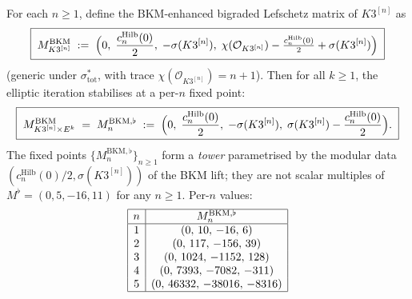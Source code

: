 \begin{theorem}
\label{thm:hyperkahler-bkm-lift-fixed-point-tower}
For each $n \geq 1$, define the BKM-enhanced bigraded Lefschetz matrix
of $K3^{[n]}$ as
\[
 \boxed{\;
 M^{\mathrm{BKM}}_{K3^{[n]}}
 \;:=\; \Bigl(0, \;\frac{c_n^{\mathrm{Hilb}}(0)}{2}, \;
 -\sigma(K3^{[n]}), \;
 \chi(\mathcal{O}_{K3^{[n]}})
 - \tfrac{c_n^{\mathrm{Hilb}}(0)}{2}
 + \sigma(K3^{[n]})\Bigr)
 \;}
\]
\textup{(}generic under $\sigma_{\mathrm{tot}}^*$, with trace
$\chi(\mathcal{O}_{K3^{[n]}}) = n + 1$\textup{).} Then for all
$k \geq 1$, the elliptic iteration stabilises at a per-$n$ fixed point:
\[
 \boxed{\;
 M_{K3^{[n]} \times E^k}^{\mathrm{BKM}}
 \;=\; M^{\mathrm{BKM}, \flat}_n
 \;:=\; \Bigl(0, \;\frac{c_n^{\mathrm{Hilb}}(0)}{2}, \;
 -\sigma(K3^{[n]}), \;
 \sigma(K3^{[n]}) - \frac{c_n^{\mathrm{Hilb}}(0)}{2}\Bigr).
 \;}
\]
The fixed points $\{M^{\mathrm{BKM}, \flat}_n\}_{n \geq 1}$ form a
\emph{tower} parametrised by the modular data
$(c_n^{\mathrm{Hilb}}(0) / 2, \sigma(K3^{[n]}))$ of the BKM lift; they
are not scalar multiples of $M^{\flat} = (0, 5, -16, 11)$ for any
$n \geq 1$. Per-$n$ values:
\[
\begin{array}{|c|c|}
\hline
n & M^{\mathrm{BKM}, \flat}_n \\
\hline
1 & (0,\, 10,\, -16,\, 6) \\
2 & (0,\, 117,\, -156,\, 39) \\
3 & (0,\, 1024,\, -1152,\, 128) \\
4 & (0,\, 7393,\, -7082,\, -311) \\
5 & (0,\, 46332,\, -38016,\, -8316) \\
\hline
\end{array}
\]
\end{theorem}

